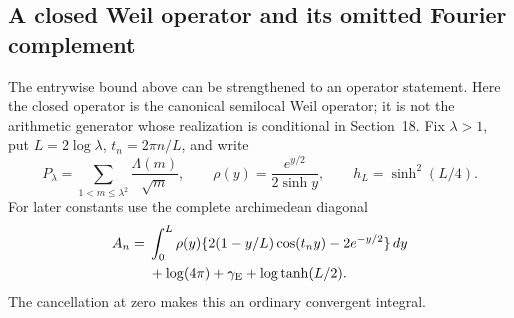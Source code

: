 \subsection*{A closed Weil operator and its omitted Fourier complement}
The entrywise bound above can be strengthened to an operator statement.
Here the closed operator is the canonical semilocal Weil operator; it is
not the arithmetic generator whose realization is conditional in Section~18.
Fix $\lambda>1$, put $L=2\log\lambda$, $t_n=2\pi n/L$, and write
\[
 P_\lambda=\sum_{1<m\le\lambda^2}\frac{\Lambda(m)}{\sqrt m},
 \qquad \rho(y)=\frac{e^{y/2}}{2\sinh y},
 \qquad h_L=\sinh^2(L/4).
\]
For later constants use the complete archimedean diagonal
\begin{align}
 A_n={}&\int_0^L\rho(y)
 \{2(1-y/L)\cos(t_ny)-2e^{-y/2}\}\,dy \notag\\
 &+\log(4\pi)+\gamma_{\rm E}+\log\tanh(L/2).
 \label{eq:v114-arch-diagonal}
\end{align}
The cancellation at zero makes this an ordinary convergent integral.

